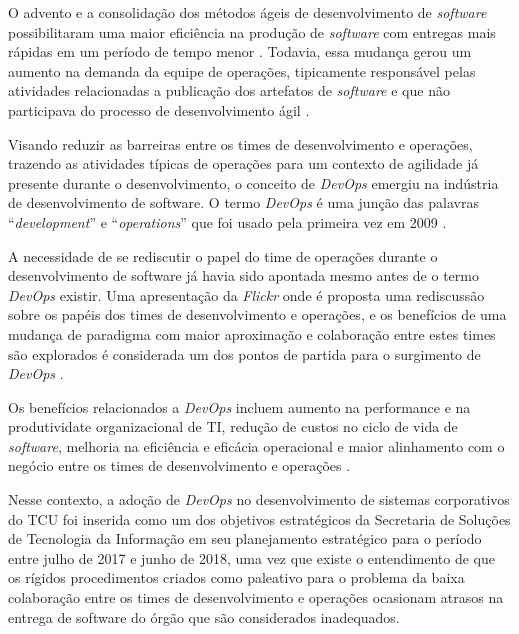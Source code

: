 O advento e a consolidação dos métodos ágeis de desenvolvimento de
\textit{software} possibilitaram uma maior eficiência na produção de
\textit{software} com entregas mais rápidas em um período de tempo menor
\cite{}. Todavia, essa mudança gerou um aumento na demanda da equipe de
operações, tipicamente responsável pelas atividades relacionadas a
publicação dos artefatos de \textit{software} e que não participava
do processo de desenvolvimento ágil \cite{humble2010continuous}.

Visando reduzir as barreiras entre os times de desenvolvimento e operações,
trazendo as atividades típicas de operações para um contexto de agilidade
já presente durante o desenvolvimento, o conceito de \textit{DevOps} emergiu
na indústria de desenvolvimento de software. O termo \textit{DevOps} é uma
junção das palavras ``\textit{development}'' e ``\textit{operations}'' que
foi usado pela primeira vez em 2009 \cite{devops_for_developers}.

A necessidade de se rediscutir o papel do time de operações durante o
desenvolvimento de software já havia sido apontada mesmo antes de o termo
\textit{DevOps} existir. Uma apresentação da \textit{Flickr} \cite{flickr}
onde é proposta uma rediscussão sobre os papéis dos times de desenvolvimento e
operações, e os benefícios de uma mudança de paradigma
com maior aproximação e colaboração entre estes times são
explorados é considerada um dos pontos de partida para o surgimento de
\textit{DevOps} \cite{devops_for_developers}.

Os benefícios relacionados a \textit{DevOps} incluem aumento na performance
e na produtividate organizacional de TI, redução de custos no ciclo de vida
de \textit{software}, melhoria na eficiência e eficácia operacional e maior
alinhamento com o negócio entre os times de desenvolvimento e operações
\cite{characterizing_devops}.

Nesse contexto, a adoção de \textit{DevOps} no desenvolvimento de sistemas
corporativos do \acrfull{TCU} foi inserida como um dos objetivos estratégicos da
Secretaria de Soluções de Tecnologia da Informação em seu planejamento estratégico
para o período entre julho de 2017 e junho de 2018, uma vez que existe o
entendimento de que os rígidos procedimentos criados como paleativo para o
problema da baixa colaboração entre os times de desenvolvimento e operações
ocasionam atrasos na entrega de software do órgão que são considerados inadequados.

